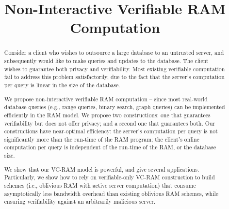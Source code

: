 \documentclass[11pt]{article}
\begin{document}
\title{{\bf Non-Interactive Verifiable RAM Computation}}
\date{\vspace{-6mm}}

\maketitle

\begin{abstract}
Consider a client who wishes to outsource a large database to an
untrusted server, and subsequently would like to make queries
and updates to the database. The client wishes to guarantee
both privacy and verifiability.
Most existing %
verifiable computation
fail to address this problem satisfactorily, due to the fact
that the server's computation per query
is linear in the size of the database.

We propose non-interactive verifiable RAM computation -- since most
real-world database queries (e.g., range queries, binary search,
graph queries) can be implemented efficiently in the RAM model.
We propose two constructions: one that guarantees verifiability but
does not offer privacy; and a second one that guarantees both.
Our constructions have near-optimal efficiency: the server's computation
per query is not significantly more than the run-time of the
RAM program; the client's online computation per query is independent
of the run-time of the RAM, or the database size.

We show that our VC-RAM model is powerful, and give several applications.
Particularly, we show how to rely on verifiable-only VC-RAM
construction to build
\name schemes (i.e., oblivious
RAM with active server computation)
that consume asymptotically less bandwidth overhead
than existing oblivious RAM schemes, while ensuring
verifiability against an arbitrarily malicious server.
\end{abstract}












%
\end{document}
